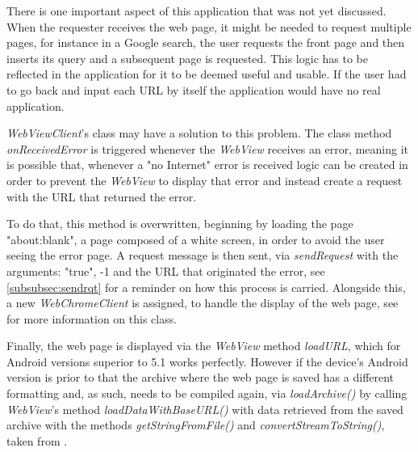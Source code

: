 There is one important aspect of this application that was not yet discussed. When the requester receives the web page, it might be needed to request multiple pages, for instance in a Google search, the user requests the front page and then inserts its query and a subsequent page is requested. This logic has to be reflected in the application for it to be deemed useful and usable. If the user had to go back and input each \gls{URL} by itself the application would have no real application.

\textit{WebViewClient}'s class may have a solution to this problem. The class method \textit{onReceivedError} is triggered whenever the \textit{WebView} receives an error, meaning it is possible that, whenever a "no Internet" error is received logic can be created in order to prevent the \textit{WebView} to display that error and instead create a request with the \gls{URL} that returned the error.

To do that, this method is overwritten, beginning by loading the page "about:blank", a page composed of a white screen, in order to avoid the user seeing the error page. A request message is then sent, via \textit{sendRequest} with the arguments: "true", -1 and the \gls{URL} that originated the error, see \ref{subsubsec:sendrqt} for a reminder on how this process is carried. Alongside this, a new \textit{WebChromeClient} is assigned, to handle the display of the web page, see \cite{webview} for more information on this class.

Finally, the web page is displayed via the \textit{WebView} method \textit{loadURL}, which for Android versions superior to 5.1 works perfectly. However if the device's Android version is prior to that the archive where the web page is saved has a different formatting and, as such, needs to be compiled again, via \textit{loadArchive()} by calling \textit{WebView}'s method \textit{loadDataWithBaseURL()} with data retrieved from the saved archive with the methods \textit{getStringFromFile()} and \textit{convertStreamToString()}, taken from \cite{stack}.

